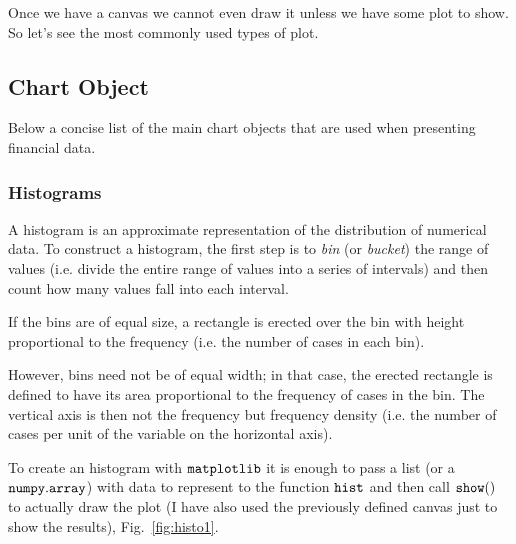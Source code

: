 Once we have a canvas we cannot even draw it unless we have some plot to
show. So let's see the most commonly used types of plot.

\subsection{Chart Object}\label{chart-object}

Below a concise list of the main chart objects that are used
when presenting financial data.

\subsubsection{Histograms}\label{histograms}

A histogram is an approximate representation of the distribution of
numerical data. To construct a histogram, the first step is to \emph{bin}
(or \emph{bucket}) the range of values (i.e. divide the entire range of
values into a series of intervals) and then count how many values fall
into each interval.

If the bins are of equal size, a rectangle is erected over the bin with
height proportional to the frequency (i.e. the number of cases in each
bin).

However, bins need not be of equal width; in that case, the erected
rectangle is defined to have its area proportional to the frequency of
cases in the bin. The vertical axis is then not the frequency but
frequency density (i.e. the number of cases per unit of the variable on
the horizontal axis).

To create an histogram with \(\tt{matplotlib}\) it is enough to pass
a list (or a \(\tt{numpy.array}\)) with data to represent to the
function \(\tt{hist}\) and then call \(\tt{show()}\) to actually draw
the plot (I have also used the previously defined canvas just to show
the results), Fig.~\ref{fig:histo1}.

